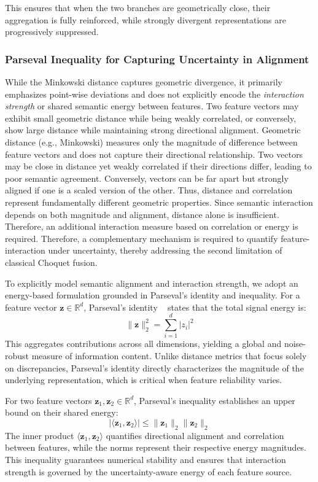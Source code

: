 \documentclass[12pt]{article}
\begin{document}
This ensures that when the two branches are geometrically close, their aggregation is fully reinforced, while strongly divergent representations are progressively suppressed.

\subsubsection{Parseval Inequality for Capturing Uncertainty in Alignment}

While the Minkowski distance captures geometric divergence, it primarily emphasizes point-wise deviations and does not explicitly encode the \emph{interaction strength} or shared semantic energy between features. Two feature vectors may exhibit small geometric distance while being weakly correlated, or conversely, show large distance while maintaining strong directional alignment. Geometric distance (e.g., Minkowski) measures only the magnitude of difference between feature vectors and does not capture their directional relationship. Two vectors may be close in distance yet weakly correlated if their directions differ, leading to poor semantic agreement. Conversely, vectors can be far apart but strongly aligned if one is a scaled version of the other. Thus, distance and correlation represent fundamentally different geometric properties. Since semantic interaction depends on both magnitude and alignment, distance alone is insufficient. Therefore, an additional interaction measure based on correlation or energy is required. Therefore, a complementary mechanism is required to quantify feature-interaction under uncertainty, thereby addressing the second limitation of classical Choquet fusion.

To explicitly model semantic alignment and interaction strength, we adopt an energy-based formulation grounded in Parseval's identity and inequality. For a feature vector $\mathbf{z} \in \mathbb{R}^d$, Parseval's identity ~\cite{b11} states that the total signal energy is:
\begin{equation*}
    \|\mathbf{z}\|_2^2 = \sum_{i=1}^{d} |z_i|^2
    \label{eq:parseval_identity}
\end{equation*}
This aggregates contributions across all dimensions, yielding a global and noise-robust measure of information content. Unlike distance metrics that focus solely on discrepancies, Parseval's identity directly characterizes the magnitude of the underlying representation, which is critical when feature reliability varies.

For two feature vectors $\mathbf{z}_1, \mathbf{z}_2 \in \mathbb{R}^d$, Parseval's inequality establishes an upper bound on their shared energy:
\begin{equation*}
    |\langle \mathbf{z}_1, \mathbf{z}_2 \rangle| \leq \|\mathbf{z}_1\|_2 \|\mathbf{z}_2\|_2
    \label{eq:parseval_inequality}
\end{equation*}
The inner product $\langle \mathbf{z}_1, \mathbf{z}_2 \rangle$ quantifies directional alignment and correlation between features, while the norms represent their respective energy magnitudes. This inequality guarantees numerical stability and ensures that interaction strength is governed by the uncertainty-aware energy of each feature source.
\end{document}
